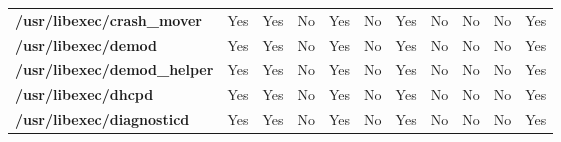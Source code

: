 \begin{center}
{\begin{tabular}{|>{\bfseries} l | C | C | C | C | C | C | C | C | C | C |}
					/usr/libexec/crash\_mover & Yes & Yes & \color{green}No & \color{red}Yes & \color{green}No & \color{red}Yes & No & No & \color{green}No & \color{red}Yes\\ 
					/usr/libexec/demod & Yes & Yes & \color{green}No & \color{red}Yes & \color{green}No & \color{red}Yes & No & No & \color{green}No & \color{red}Yes\\ 
					/usr/libexec/demod\_helper & Yes & Yes & \color{green}No & \color{red}Yes & \color{green}No & \color{red}Yes & No & No & \color{green}No & \color{red}Yes\\ 
					/usr/libexec/dhcpd & Yes & Yes & \color{green}No & \color{red}Yes & \color{green}No & \color{red}Yes & No & No & \color{green}No & \color{red}Yes\\ 
					/usr/libexec/diagnosticd & Yes & Yes & \color{green}No & \color{red}Yes & \color{green}No & \color{red}Yes & No & No & \color{green}No & \color{red}Yes\\ 

			\end{tabular}
		}
	\end{center}




